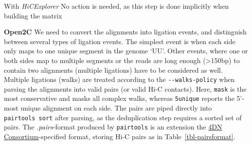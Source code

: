 \documentclass[
  11pt,
  a4paper,
]{scrbook}
\let\oldemph\emph
\renewcommand\emph[1]{\oldemph{\color{gray}#1}}
\begin{document}
With \emph{HiCExplorer} No action is needed, as this step is done
implicitly when building the matrix

\textbf{Open2C} We need to convert the alignments into ligation events,
and distinguish between several types of ligation events. The simplest
event is when each side only maps to one unique segment in the genome
`UU'. Other events, where one or both sides map to multiple segments or
the reads are long enough (\textgreater150bp) to contain two alignments
(multiple ligations) have to be considered as well. Multiple ligations
(walks) are treated according to the \texttt{-\/-walks-policy} when
parsing the alignments into valid pairs (or valid Hi-C contacts). Here,
\texttt{mask} is the most conservative and masks all complex walks,
whereas \texttt{5unique} reports the 5'-most unique alignment on each
side. The pairs are piped directly into \texttt{pairtools\ sort} after
parsing, as the deduplication step requires a sorted set of pairs. The
\emph{.pairs}-format produced by \texttt{pairtools} is an extension the
\href{https://data.4dnucleome.org/file-formats/pairs/}{4DN
Consortium}-specified format, storing Hi-C pairs as in
Table~\ref{tbl-pairsformat}.

\small
\end{document}
